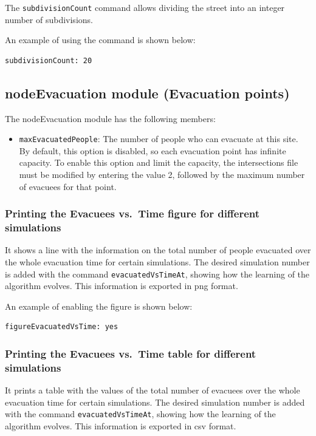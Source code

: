 \documentclass[12pt,a4paper]{book}
\begin{document}
The \texttt{subdivisionCount} command allows dividing the street into an integer number of
subdivisions.

An example of using the command is shown below:
\begin{lstlisting}[style=control]
subdivisionCount: 20
\end{lstlisting}

\subsection{nodeEvacuation module (Evacuation points)}
The nodeEvacuation module has the following members:
\begin{itemize}
  \item \texttt{maxEvacuatedPeople}: The number of people who can evacuate at this site. By
    default, this option is disabled, so each evacuation point has infinite capacity. To enable
    this option and limit the capacity, the intersections file must be modified by entering the
    value 2, followed by the maximum number of evacuees for that point.
\end{itemize}

\subsubsection*{Printing the Evacuees vs.\ Time figure for different simulations}
It shows a line with the information on the total number of people evacuated over the whole
evacuation time for certain simulations. The desired simulation number is added with the command
\texttt{evacuatedVsTimeAt}, showing how the learning of the algorithm evolves. This
information is exported in png format.

An example of enabling the figure is shown below:
\begin{lstlisting}[style=control]
figureEvacuatedVsTime: yes
\end{lstlisting}

\subsubsection*{Printing the Evacuees vs.\ Time table for different simulations}
It prints a table with the values of the total number of evacuees over the whole evacuation time
for certain simulations. The desired simulation number is added with the command
\texttt{evacuatedVsTimeAt}, showing how the learning of the algorithm evolves. This
information is exported in csv format.
\end{document}
